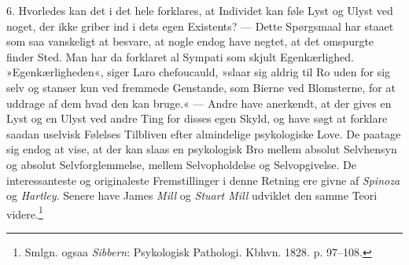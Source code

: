 \documentclass[12pt,a4paper,openany]{book}
\newcommand{\opage}[1]{\marginnote{\footnotesize\textit{[#1]}}}
\begin{document}
\opage{294}6. Hvorledes kan det i det hele forklares, at Individet kan
føle Lyst og Ulyst ved noget, der ikke griber ind i dets egen Existents?
--- Dette Spørgsmaal har staaet som saa vanskeligt at besvare, at nogle
endog have negtet, at det omspurgte finder Sted. Man har da forklaret al
Sympati som skjult Egenkærlighed. »Egenkærligheden«, siger Laro
chefoucauld, »slaar sig aldrig til Ro uden for sig selv og stanser kun
ved fremmede Genstande, som Bierne ved Blomsterne, for at uddrage af dem
hvad den kan bruge.« --- Andre have anerkendt, at der gives en Lyst og
en Ulyst ved andre Ting for disses egen Skyld, og have søgt at forklare
saadan uselvisk Følelses Tilbliven efter almindelige psykologiske Love.
De paatage sig endog at vise, at der kan slaas en psykologisk Bro mellem
absolut Selvhensyn og absolut Selvforglemmelse, mellem Selvopholdelse og
Selvopgivelse. De interessanteste og originaleste Fremstillinger i denne
Retning ere givne af \emph{Spinoza} og \emph{Hartley}. Senere have James
\emph{Mill} og \emph{Stuart Mill} udviklet den samme Teori
videre.\footnote[1]{Smlgn. ogsaa \emph{Sibbern}: Psykologisk Pathologi.
Kbhvn. 1828. p. 97--108.}
\end{document}
